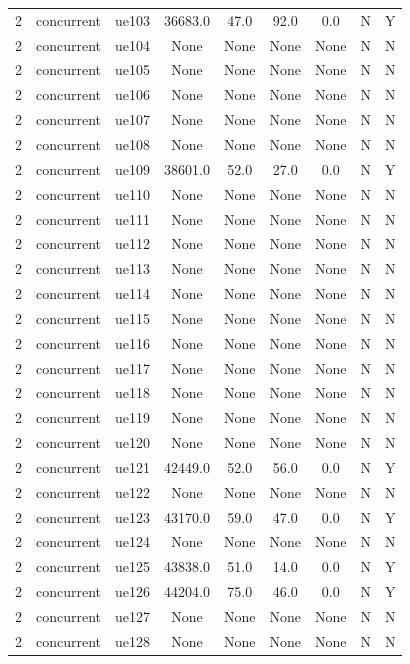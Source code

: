 \begin{table}[ht]
\begin{tabular}{|c|c|c|c|c|c|c|c|c|}
2 & concurrent & ue103 & 36683.0 & 47.0 & 92.0 & 0.0 & N & Y \\
2 & concurrent & ue104 & None & None & None & None & N & N \\
2 & concurrent & ue105 & None & None & None & None & N & N \\
2 & concurrent & ue106 & None & None & None & None & N & N \\
2 & concurrent & ue107 & None & None & None & None & N & N \\
2 & concurrent & ue108 & None & None & None & None & N & N \\
2 & concurrent & ue109 & 38601.0 & 52.0 & 27.0 & 0.0 & N & Y \\
2 & concurrent & ue110 & None & None & None & None & N & N \\
2 & concurrent & ue111 & None & None & None & None & N & N \\
2 & concurrent & ue112 & None & None & None & None & N & N \\
2 & concurrent & ue113 & None & None & None & None & N & N \\
2 & concurrent & ue114 & None & None & None & None & N & N \\
2 & concurrent & ue115 & None & None & None & None & N & N \\
2 & concurrent & ue116 & None & None & None & None & N & N \\
2 & concurrent & ue117 & None & None & None & None & N & N \\
2 & concurrent & ue118 & None & None & None & None & N & N \\
2 & concurrent & ue119 & None & None & None & None & N & N \\
2 & concurrent & ue120 & None & None & None & None & N & N \\
2 & concurrent & ue121 & 42449.0 & 52.0 & 56.0 & 0.0 & N & Y \\
2 & concurrent & ue122 & None & None & None & None & N & N \\
2 & concurrent & ue123 & 43170.0 & 59.0 & 47.0 & 0.0 & N & Y \\
2 & concurrent & ue124 & None & None & None & None & N & N \\
2 & concurrent & ue125 & 43838.0 & 51.0 & 14.0 & 0.0 & N & Y \\
2 & concurrent & ue126 & 44204.0 & 75.0 & 46.0 & 0.0 & N & Y \\
2 & concurrent & ue127 & None & None & None & None & N & N \\
2 & concurrent & ue128 & None & None & None & None & N & N \\

\end{tabular}
\end{table}
